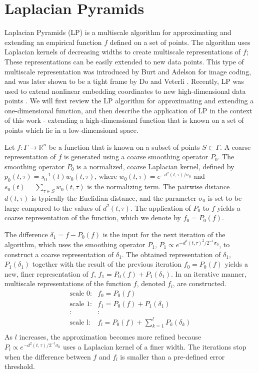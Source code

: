 \documentclass[aip,jcp,preprint]{revtex4-1}
\begin{document}
\section{Laplacian Pyramids} \label{sec:LapPyr}

Laplacian Pyramids (LP) is a multiscale algorithm for approximating and extending an empirical function $f$ defined on a set of points.
%
The algorithm uses Laplacian kernels of decreasing widths to create multiscale representations of $f$;
These representations can be easily extended to new data points.
%
This type of multiscale representation was introduced by Burt and Adelson \cite{burt1983laplacian} for image coding,
and was later shown to be a tight frame by Do and Veterli \cite{do2003framing}.
%
Recently, LP was used to extend nonlinear embedding coordinates to new high-dimensional data points \cite{rabin2012heterogeneous}.
%
We will first review the LP algorithm for approximating and extending a one-dimensional function,
and then describe the application of LP in the context of this work - extending a high-dimensional function that is known on a set of points which lie in a low-dimensional space.

Let $f: \Gamma \rightarrow \mathbb{R}^n$ be a function that is known on a subset of points $S \subset \Gamma$.
%
A coarse representation of $f$ is generated using a coarse smoothing operator $P_0$.
%
The smoothing operator $P_0$ is a normalized, coarse Laplacian kernel, defined by $p_0(t,\tau)= s_0^{-1}(t)w_0(t,\tau)$,
where $w_0(t,\tau)=e^{-d^2(t,\tau) / \sigma_0}$ and $s_0(t)=\sum_{\tau \in S}w_0(t,\tau)$ is the normalizing term.
%
The pairwise distance $d(t,\tau)$ is typically the Euclidian distance, and the parameter $\sigma_0$ is set to be large compared to the values of $d^2(t,\tau)$.
%
The application of $P_0$ to $f$ yields a coarse representation of the function, which we denote by $f_0=P_0(f)$.

The difference $\delta_1 = f-P_0(f)$ is the input for the next iteration of the algorithm,
which uses the smoothing operator $P_1$, $P_1 \propto e^{-d^2(t,\tau)^2 / 2^{-1} \sigma_0}$, to construct a coarse representation of $\delta_1$.
%
The obtained representation of $\delta_1$, $P_1(\delta_1)$ together with the result of the previous iteration $f_0 = P_0(f)$
yields a new, finer representation of $f$, $f_1 = P_0(f) + P_1(\delta_1)$.
%
In an iterative manner, multiscale representations of the function $f$, denoted $f_l$, are constructed.
\begin{equation} \label{eq:LP_multi_scale}
 \begin{array}{cl}
\mbox{scale 0:} & f_0 = P_0(f) \\
\mbox{scale 1:} & f_1 = P_0(f) + P_1(\delta_1) \\
: & : \\
\mbox{scale l:} & f_l = P_0(f) + \sum_{k=1}^{l}P_k(\delta_k)\\
\end{array}
\end{equation}
As $l$ increases, the approximation becomes more refined because $P_l \propto e^{-d^2(t,\tau) / 2^{-l} \sigma_0}$ uses a Laplacian kernel of a finer width.
%
The iterations stop when the difference between $f$ and $f_l$ is smaller than a pre-defined error threshold.
\end{document}
